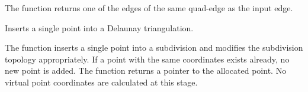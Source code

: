 The function returns one of the edges of the same quad-edge as the input edge.

Inserts a single point into a Delaunay triangulation.


\begin{description}
\end{description}

The function inserts a single point into a subdivision and modifies the subdivision topology appropriately. If a point with the same coordinates exists already, no new point is added. The function returns a pointer to the allocated point. No virtual point coordinates are calculated at this stage.

\fi

